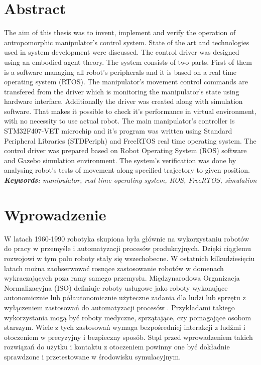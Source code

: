 \documentclass[a4paper, 12pt, twoside]{article}
\begin{document}
\section*{Abstract}
\thispagestyle{empty}
\justify
The aim of this thesis was to invent, implement and verify the operation of antropomorphic manipulator's control system. State of the art and technologies used in system development were discussed. The control driver was designed using an embodied agent theory. The system consists of two parts. First of them is a software managing all robot's peripherals and it is based on a real time operating system (RTOS). The manipulator's movement control commands are transfered from the driver which is monitoring the manipulator's state using hardware interface. Additionally the driver was created along with simulation software. That makes it possible to check it's performance in virtual environment, with no necessity to use actual robot. The main manipulator's controller is STM32F407-VET microchip and it's program was written using Standard Peripheral Libraries (STDPeriph) and FreeRTOS real time operating system. The control driver was prepared based on Robot Operating System (ROS) software and Gazebo simulation environment. The system's verification was done by analysing robot's tests of movement along specified trajectory to given position.
\vspace{0.5 cm}
\\
\textit{\textbf{Keywords:}}
\textit{manipulator, real time operating system, ROS, FreeRTOS, simulation}

\newpage



\tableofcontents

\newpage
\justify

\vspace*{1.5 cm}
\section{Wprowadzenie}
\vspace{1.5 cm}

W latach 1960-1990 robotyka skupiona była głównie na wykorzystaniu robotów do pracy w przemyśle i automatyzacji procesów produkcyjnych. Dzięki ciągłemu rozwojowi w tym polu roboty stały się wszechobecne. W ostatnich kilkudziesięciu latach można zaobserwować rosnące zastosowanie robotów w domenach wykraczających poza ramy samego przemysłu. Międzynarodowa Organizacja Normalizacyjna (ISO) definiuje roboty usługowe jako roboty wykonujące autonomicznie lub półautonomicznie użyteczne zadania dla ludzi lub sprzętu z wyłączeniem zastosowań do automatyzacji procesów \cite{isodef}. Przykładami takiego wykorzystania mogą być roboty medyczne, sprzątające, czy pomagające osobom starszym. Wiele z tych zastosowań wymaga bezpośredniej interakcji z ludźmi i otoczeniem w precyzyjny i bezpieczny sposób. Stąd przed wprowadzeniem takich rozwiązań do użytku i kontaktu z otoczeniem powinny one być dokładnie sprawdzone i przetestowane w środowisku symulacyjnym. 
\end{document}
